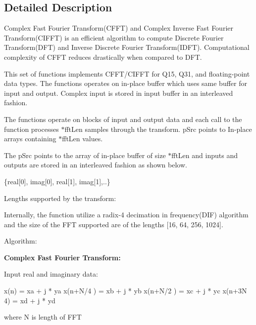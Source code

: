 \subsection{Detailed Description}
\begin{DoxyParagraph}{}
Complex Fast Fourier Transform(\-C\-F\-F\-T) and Complex Inverse Fast Fourier Transform(\-C\-I\-F\-F\-T) is an efficient algorithm to compute Discrete Fourier Transform(\-D\-F\-T) and Inverse Discrete Fourier Transform(\-I\-D\-F\-T). Computational complexity of C\-F\-F\-T reduces drastically when compared to D\-F\-T. 
\end{DoxyParagraph}
\begin{DoxyParagraph}{}
This set of functions implements C\-F\-F\-T/\-C\-I\-F\-F\-T for Q15, Q31, and floating-\/point data types. The functions operates on in-\/place buffer which uses same buffer for input and output. Complex input is stored in input buffer in an interleaved fashion.
\end{DoxyParagraph}
\begin{DoxyParagraph}{}
The functions operate on blocks of input and output data and each call to the function processes {$\ast$fft\-Len} samples through the transform. {\ttfamily p\-Src} points to In-\/place arrays containing {$\ast$fft\-Len} values. 
\end{DoxyParagraph}
\begin{DoxyParagraph}{}
The {\ttfamily p\-Src} points to the array of in-\/place buffer of size {$\ast$fft\-Len} and inputs and outputs are stored in an interleaved fashion as shown below. 
\begin{DoxyPre} \{real[0], imag[0], real[1], imag[1],..\} \end{DoxyPre}

\end{DoxyParagraph}
\begin{DoxyParagraph}{Lengths supported by the transform\-: }

\end{DoxyParagraph}
\begin{DoxyParagraph}{}
Internally, the function utilize a radix-\/4 decimation in frequency(\-D\-I\-F) algorithm and the size of the F\-F\-T supported are of the lengths \mbox{[}16, 64, 256, 1024\mbox{]}.
\end{DoxyParagraph}
\begin{DoxyParagraph}{Algorithm\-: }

\end{DoxyParagraph}
{\bfseries Complex Fast Fourier Transform\-:} \begin{DoxyParagraph}{}
Input real and imaginary data\-: 
\begin{DoxyPre}    
  x(n) = xa + j * ya    
  x(n+N/4 ) = xb + j * yb    
  x(n+N/2 ) = xc + j * yc    
  x(n+3N 4) = xd + j * yd    
  \end{DoxyPre}
 where N is length of F\-F\-T 
\end{DoxyParagraph}
